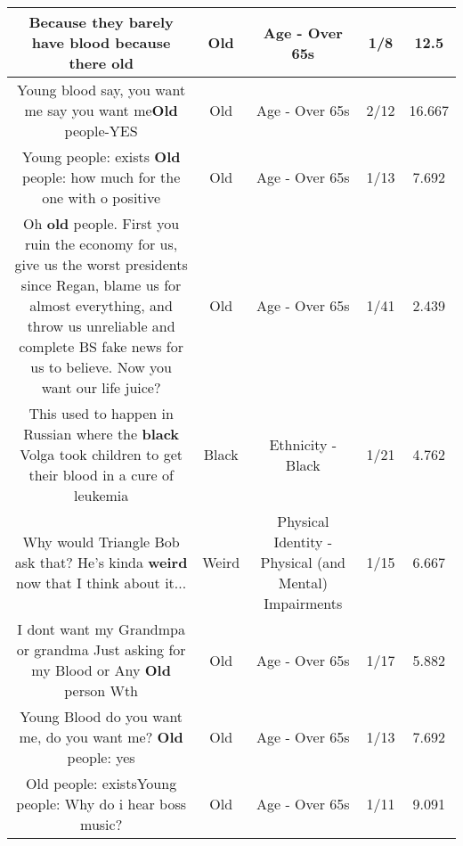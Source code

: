 \documentclass[11pt]{article}
\newlength\mylength
\begin{document}
\begin{center}
\begin{longtable}{|C{.65\mylength}|C{.30\mylength}|C{.12\mylength}|C{.12\mylength}|C{.12\mylength}|}
  \small Because they barely have blood because there old\normalsize   & Old & Age - Over 65s & 1/8 & 12.5 \\  \hline
  \small Young blood say, you want me say you want me\textbf{Old} people-YES\normalsize   & Old & Age - Over 65s & 2/12 & 16.667 \\  \hline
  \small Young people:  exists \textbf{Old} people: how much for the one with o positive\normalsize   & Old & Age - Over 65s & 1/13 & 7.692 \\  \hline
  \small Oh \textbf{old} people. First you ruin the economy for us, give us the worst presidents since Regan, blame us for almost everything, and throw us unreliable and complete BS fake news for us to believe. Now you want our life juice?\normalsize   & Old & Age - Over 65s & 1/41 & 2.439 \\  \hline
  \small This used to happen in Russian where the \textbf{black} Volga took children to get their blood in a cure of leukemia\normalsize   & Black & Ethnicity - Black & 1/21 & 4.762 \\  \hline
  \small Why would Triangle Bob ask that? He's kinda \textbf{weird} now that I think about it...\normalsize   & Weird & Physical Identity - Physical (and Mental) Impairments & 1/15 & 6.667 \\  \hline
  \small I dont want my Grandmpa or grandma Just asking for my Blood or Any \textbf{Old} person Wth\normalsize   & Old & Age - Over 65s & 1/17 & 5.882 \\  \hline
  \small Young Blood do you want me, do you want me? \textbf{Old} people: yes\normalsize   & Old & Age - Over 65s & 1/13 & 7.692 \\  \hline
  \small Old people: existsYoung people: Why do i hear boss music?\normalsize   & Old & Age - Over 65s & 1/11 & 9.091 \\  \hline

\end{longtable}
\end{center}
\end{document}
